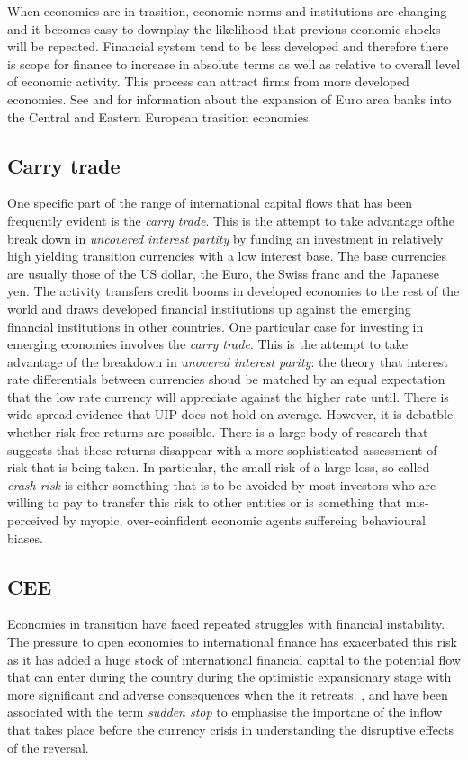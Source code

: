 \documentclass[12pt, a4paper, oneside]{article} %
\begin{document}
When economies are in trasition, economic norms and institutions are changing and it becomes easy to downplay the likelihood that previous economic shocks will be repeated.  Financial system tend to be less developed and therefore there is scope for finance to increase in absolute terms as well as relative to overall level of economic activity.  This process can attract firms from more developed economies. See \citet{ONBcarry} and \citet{EBRD} for information about the expansion of Euro area banks into the Central and Eastern European trasition economies.   

\subsection{Carry trade}
One specific part of the range of international capital flows that has been frequently evident is the \emph{carry trade}.  This is the attempt to take advantage ofthe break down in \emph{uncovered interest partity} by funding an investment in relatively high yielding transition currencies with a low interest base.  The base currencies are usually those of the US dollar, the Euro, the Swiss franc and the Japanese yen.  The activity transfers credit booms in developed economies to the rest of the world and draws developed financial institutions up against the emerging financial institutions in other countries.  
One particular case for investing in emerging economies involves the \emph{carry trade}.  This is the attempt to take advantage of the breakdown in \emph{unovered interest parity}: the theory that interest rate differentials between currencies shoud be matched by an equal expectation that the low rate currency will appreciate against the higher rate until.  There is wide spread evidence that UIP does not hold on average.  However, it is debatble whether risk-free returns are possible.  There is a large body of research that suggests that these returns disappear with a more sophisticated assessment of risk that is being taken.  In particular, the small risk of a large loss, so-called \emph{crash risk} is either something that is to be avoided by most investors who are willing to pay to transfer this risk to other entities or is something that mis-perceived by myopic, over-coinfident economic agents suffereing behavioural biases.  


\subsection{CEE}
Economies in transition have faced repeated struggles with financial instability.  The pressure to open economies to international finance has exacerbated this risk as it has added a huge stock of international financial capital to the potential flow that can enter during the country during the optimistic expansionary stage with more significant and adverse consequences when the it retreats.   \citet{DornbuschSS}, \citet{CalvoSS} and \citet{KrugmanSS} have been associated with the term \emph{sudden stop} to emphasise the importane of the inflow that takes place before the currency crisis in understanding the disruptive effects of the reversal.   
\end{document}
